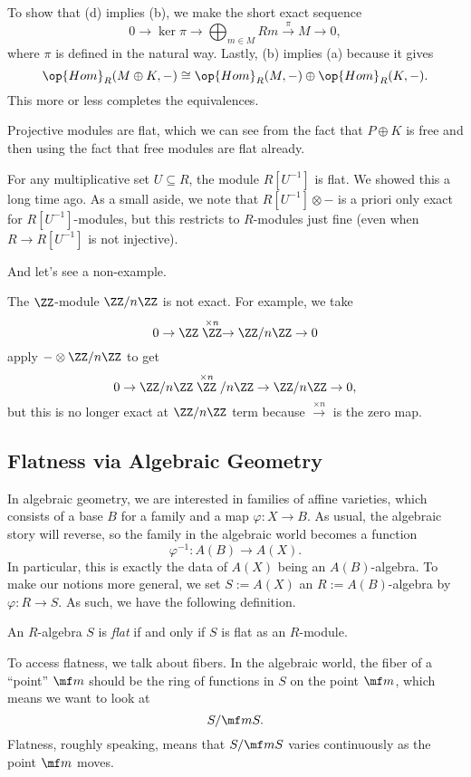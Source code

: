 To show that (d) implies (b), we make the short exact sequence
\[0\to\ker\pi\to\bigoplus_{m\in M}Rm\stackrel\pi\to M\to 0,\]
where $\pi$ is defined in the natural way. Lastly, (b) implies (a) because it gives
\[\op{Hom}_R(M\oplus K,-)\cong\op{Hom}_R(M,-)\oplus\op{Hom}_R(K,-).\]
This more or less completes the equivalences.
\begin{example}
	Projective modules are flat, which we can see from the fact that $P\oplus K$ is free and then using the fact that free modules are flat already.
\end{example}
\begin{example}
	For any multiplicative set $U\subseteq R$, the module $R\left[U^{-1}\right]$ is flat. We showed this a long time ago. As a small aside, we note that $R\left[U^{-1}\right]\otimes-$ is a priori only exact for $R\left[U^{-1}\right]$-modules, but this restricts to $R$-modules just fine (even when $R\to R\left[U^{-1}\right]$ is not injective).
\end{example}
And let's see a non-example.
\begin{nex}
	The $\ZZ$-module $\ZZ/n\ZZ$ is not exact. For example, we take
	\[0\to\ZZ\stackrel{\times n}\ZZ\to\ZZ/n\ZZ\to0\]
	apply $-\otimes\ZZ/n\ZZ$ to get
	\[0\to\ZZ/n\ZZ\stackrel{\times n}\ZZ/n\ZZ\to\ZZ/n\ZZ\to0,\]
	but this is no longer exact at $\ZZ/n\ZZ$ term because $\stackrel{\times n}\to$ is the zero map.
\end{nex}

\subsection{Flatness via Algebraic Geometry}
In algebraic geometry, we are interested in families of affine varieties, which consists of a base $B$ for a family and a map $\varphi:X\to B$. As usual, the algebraic story will reverse, so the family in the algebraic world  becomes a function
\[\varphi^{-1}:A(B)\to A(X).\]
In particular, this is exactly the data of $A(X)$ being an $A(B)$-algebra. To make our notions more general, we set $S:=A(X)$ an $R:=A(B)$-algebra by $\varphi:R\to S$. As such, we have the following definition.
\begin{definition}[Flat]
	An $R$-algebra $S$ is \textit{flat} if and only if $S$ is flat as an $R$-module.
\end{definition}
To access flatness, we talk about fibers. In the algebraic world, the fiber of a ``point'' $\mf m$ should be the ring of functions in $S$ on the point $\mf m$, which means we want to look at
\[S/\mf mS.\]
Flatness, roughly speaking, means that $S/\mf mS$ varies continuously as the point $\mf m$ moves.

